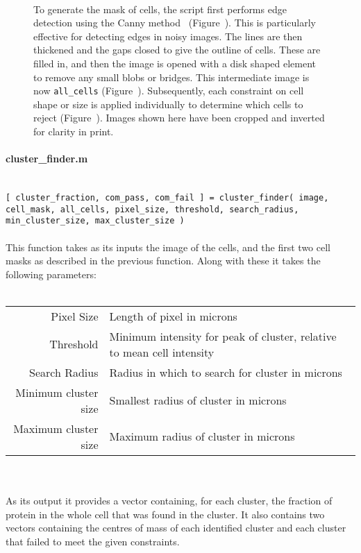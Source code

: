 \documentclass[../main.tex]{subfiles}
\begin{document}
\begin{figure}[p]
\begin{center}
\\
\caption[Depiction of cell detection]{To generate the mask of cells, the script first performs edge detection using the Canny method~\citep{canny} (Figure~). This is particularly effective for detecting edges in noisy images. The lines are then thickened and the gaps closed to give the outline of cells. These are filled in, and then the image is opened with a disk shaped element to remove any small blobs or bridges. This intermediate image is now \texttt{all\_cells} (Figure~). Subsequently, each constraint on cell shape or size is applied individually to determine which cells to reject (Figure~). Images shown here have been cropped and inverted for clarity in print.}
\label{fig:imageprocessing:celldetection}
\end{center}
\end{figure}


\paragraph{cluster\_finder.m}\ \\
\texttt{[ cluster\_fraction, com\_pass, com\_fail ] = cluster\_finder( image, cell\_mask, all\_cells, pixel\_size, threshold, search\_radius, min\_cluster\_size, max\_cluster\_size ) }
\\\\
This function takes as its inputs the image of the cells, and the first two cell masks as described in the previous function. Along with these it takes the following parameters:
\\\\
\begin{tabular}{rl}
Pixel Size		&	Length of pixel in microns\\
Threshold		&	Minimum intensity for peak of cluster, relative to mean cell intensity\\
Search Radius 	&	Radius in which to search for cluster in microns\\
Minimum cluster size	&	Smallest radius of cluster in microns\\
Maximum cluster size	&	Maximum radius of cluster in microns
\end{tabular}
\\\\
As its output it provides a vector containing, for each cluster, the fraction of protein in the whole cell that was found in the cluster. It also contains two vectors containing the centres of mass of each identified cluster and each cluster that failed to meet the given constraints.
\end{document}
